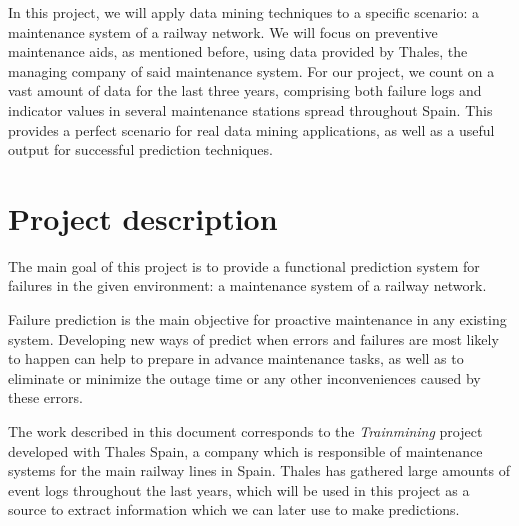 In this project, we will apply data mining techniques to a specific scenario: a maintenance system of a railway network. We will focus on preventive maintenance aids, as mentioned before, using data provided by Thales, the managing company of said maintenance system. For our project, we count on a vast amount of data for the last three years, comprising both failure logs and indicator values in several maintenance stations spread throughout Spain. This provides a perfect scenario for real data mining applications, as well as a useful output for successful prediction techniques.

\vfill

\section{Project description}
The  main goal of this project is to provide a functional prediction system for failures in the given environment: a maintenance system of a railway network.

Failure prediction is the main objective for proactive maintenance in any existing system. Developing new ways of predict when errors and failures are most likely to happen can help to prepare in advance maintenance tasks, as well as to eliminate or minimize the outage time or any other inconveniences caused by these errors.

The work described in this document corresponds to the \emph{Trainmining} project developed with Thales Spain, a company which is responsible of maintenance systems for the main railway lines in Spain. Thales has gathered large amounts of event logs throughout the last years, which will be used in this project as a source to extract information which we can later use to make predictions.